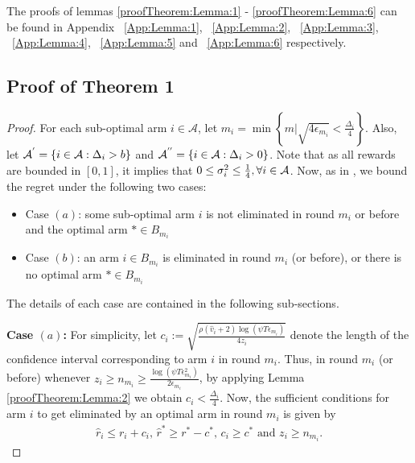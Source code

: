 The proofs of lemmas \ref{proofTheorem:Lemma:1} - \ref{proofTheorem:Lemma:6} can be found in Appendix ~\ref{App:Lemma:1}, ~\ref{App:Lemma:2}, ~\ref{App:Lemma:3}, ~\ref{App:Lemma:4}, ~\ref{App:Lemma:5} and
 ~\ref{App:Lemma:6} respectively.


\subsection*{Proof of Theorem 1}
\label{sec:proofTheorem:Theorem1}
\begin{proof}
For each sub-optimal arm ${i}\in\mathcal{A}$, let $m_{i}=\min{\left\lbrace m|\sqrt{4\epsilon_{m_i}} < \frac{\Delta_{i}}{4}\right\rbrace}$. Also, let $\mathcal{A}^{'}=\lbrace i\in \mathcal{A}: \Delta_{i} > b \rbrace$ and $\mathcal{A}^{''}=\lbrace i\in \mathcal{A}: \Delta_{i} > 0 \rbrace$. Note that as all rewards are bounded in $[0,1]$, it implies that $0\leq \sigma_i^2 \leq \frac{1}{4},\forall i\in \mathcal{A}$. Now, as in \citet{auer2010ucb}, we bound the regret under the following two cases: 
\begin{itemize}
\item {Case $(a)$}: some sub-optimal arm ${i}$ is not eliminated in round $m_{i}$ or before and the optimal arm ${*}\in B_{m_{i}}$
\item {Case $(b)$}: an arm ${i}\in B_{m_i}$ is eliminated in round $m_{i}$ (or before), or there is no optimal arm $*\in B_{m_i}$
\end{itemize} 
The details of each case are contained in the following sub-sections.


\textbf{Case $(a)$:}
For simplicity, let $c_{i} := \sqrt{\frac{\rho (\hat{v}_i + 2) \log (\psi T\epsilon_{m_{i}})}{4 z_{i}}}$ denote the length of the confidence interval corresponding to arm $i$ in round $m_i$. Thus, in round $m_i$ (or before) whenever $z_i \geq n_{m_{i}}\ge\frac{\log{(\psi T\epsilon_{m_{i}}^{2})}}{2\epsilon_{m_{i}}}$, by applying Lemma \ref{proofTheorem:Lemma:2} we obtain $c_{i} < \frac{\Delta_{i}}{4}$.
Now, the sufficient conditions for arm $i$ to get eliminated by an optimal arm in round $m_i$ is given by
	\begin{eqnarray}
	\hat{r}_{i} \leq r_{i} + c_{i} \text{, } \label{eq:armelim-casea}
 	\hat{r}^{*} \geq r^{*} - c^{*} \text{, } c_{i} \geq c^* \text{ and } z_i \geq n_{m_i} .
	\end{eqnarray}


\end{proof}
